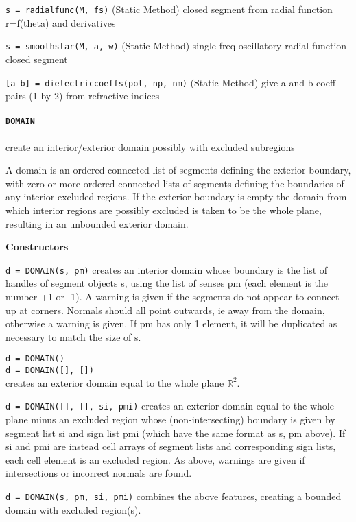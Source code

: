 {\tt s = radialfunc(M, fs)} (Static Method) closed segment from
radial function r=f(theta) and derivatives

{\tt s = smoothstar(M, a, w)} (Static Method) single-freq
oscillatory radial function closed segment

{\tt [a b] = dielectriccoeffs(pol, np, nm)} (Static Method) give a
and b coeff pairs (1-by-2) from refractive indices


 
\newpage

\paragraph{\tt DOMAIN} create an interior/exterior domain possibly with
excluded subregions

A domain is an ordered connected list of segments defining the exterior
boundary, with zero or more ordered connected lists of segments defining the
boundaries of any interior excluded regions. If the exterior boundary is empty
the domain from which interior regions are possibly excluded is taken to be
the whole plane, resulting in an unbounded exterior domain.

\textbf{Constructors}

{\tt d = DOMAIN(s, pm)} creates an interior domain whose boundary is the list
of handles of segment objects s, using the list of senses pm (each element
is the number +1 or -1). A warning is given if the segments do not appear
to connect up at corners. Normals should all point outwards, ie away from
the domain, otherwise a warning is given. If pm has only 1 element, it will
be duplicated as necessary to match the size of s.

{\tt d = DOMAIN()}\\
{\tt d = DOMAIN([], [])}\\
creates an exterior domain equal to the
whole plane $\mathbb{R}^2$.

{\tt d = DOMAIN([], [], si, pmi)} creates an exterior domain equal to the whole
plane minus an excluded region whose (non-intersecting) boundary is given
by segment list si and sign list pmi (which have the same format as s, pm
above). If si and pmi are instead cell arrays of segment lists and
corresponding sign lists, each cell element is an excluded region. As
above, warnings are given if intersections or incorrect normals are found.

{\tt d = DOMAIN(s, pm, si, pmi)} combines the above features, creating a bounded
domain with excluded region(s).

